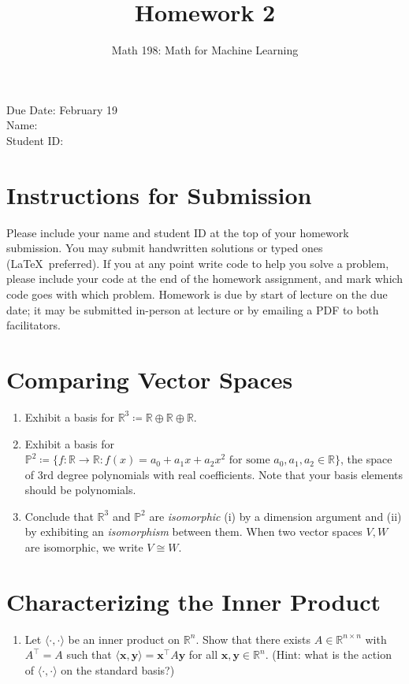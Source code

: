 \documentclass{article}
\title{Homework 2}
\author{Math 198: Math for Machine Learning}
\date{}
\begin{document}
\maketitle

\noindent
Due Date: February 19 \\
Name: \\
Student ID:

\section*{Instructions for Submission}
Please include your name and student ID at the top of your homework submission. You may submit handwritten solutions or typed ones (\LaTeX\ preferred). If you at any point write code to help you solve a problem, please include your code at the end of the homework assignment, and mark which code goes with which problem. Homework is due by start of lecture on the due date; it may be submitted in-person at lecture or by emailing a PDF to both facilitators.

\section{Comparing Vector Spaces}
\begin{enumerate}[label=\arabic*.]
	\item Exhibit a basis for $\mathbb{R}^3 \coloneqq \mathbb{R} \oplus \mathbb{R} \oplus \mathbb{R}$.
	\item Exhibit a basis for $\mathbb{P}^2 \coloneqq \{f: \mathbb{R} \to \mathbb{R} : f(x) = a_0 + a_1x + a_2x^2 \text{ for some } a_0,a_1,a_2 \in \mathbb{R} \}$, the space of 3rd degree polynomials with real coefficients. Note that your basis elements should be polynomials. 
	\item Conclude that $\mathbb{R}^3$ and $\mathbb{P}^2$ are \textit{isomorphic} (i) by a dimension argument and (ii) by exhibiting an \textit{isomorphism} between them. When two vector spaces $V,W$ are isomorphic, we write $V \cong W$. 
\end{enumerate}

\section{Characterizing the Inner Product}
\begin{enumerate}[label=\arabic*.]
	\item Let $\langle \cdot, \cdot \rangle$ be an inner product on $\mathbb{R}^n$. Show that there exists $A \in \mathbb{R}^{n\times n}$ with $A^\top = A$ such that $\langle \textbf{x}, \textbf{y} \rangle = \textbf{x}^\top A \textbf{y}$ for all $\textbf{x}, \textbf{y} \in \mathbb{R}^n$.  (Hint: what is the action of $\langle \cdot, \cdot \rangle$ on the standard basis?)
\end{enumerate}
\end{document}
